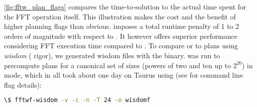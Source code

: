 \cref{fig:fftw_plan_flags} compares the time-to-solution to the actual time spent for the FFT operation itself. This illustration makes the cost and the benefit of higher planning flags than  obvious.  imposes a total runtime penalty of 1 to 2 orders of magnitude with respect to . It however offers superior performance considering FFT execution time compared to . To compare  or  to plans using \emph{wisdom} ( rigor), we generated wisdom files with the  binary.  was run to precompute plans for a canonical set of sizes (powers of two and ten up to $2^{20}$) in  mode, which in all took about one day on Taurus \cite{taurus} using (see \cite{fftw_manual} for command line flag details):
\begin{lstlisting}[language=bash]
 \$ fftwf-wisdom -v -c -n -T 24 -o wisdomf 
\end{lstlisting}

